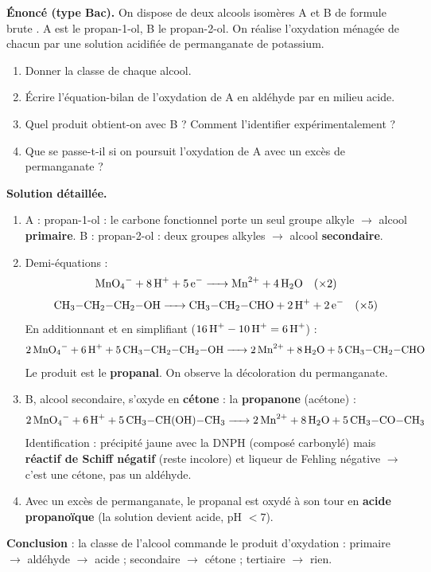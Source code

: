 \documentclass[11pt]{article}
\begin{document}
\begin{exoresolu}
\textbf{Énoncé (type Bac).} On dispose de deux alcools isomères A et B de formule brute . A est le propan-1-ol, B le propan-2-ol. On réalise l'oxydation ménagée de chacun par une solution acidifiée de permanganate de potassium.
\begin{enumerate}
\item Donner la classe de chaque alcool.
\item Écrire l'équation-bilan de l'oxydation de A en aldéhyde par  en milieu acide.
\item Quel produit obtient-on avec B ? Comment l'identifier expérimentalement ?
\item Que se passe-t-il si on poursuit l'oxydation de A avec un excès de permanganate ?
\end{enumerate}
\tcblower
\textbf{Solution détaillée.}
\begin{enumerate}
\item A : propan-1-ol  : le carbone fonctionnel porte un seul groupe alkyle $\to$ alcool \textbf{primaire}. B : propan-2-ol  : deux groupes alkyles $\to$ alcool \textbf{secondaire}.
\item Demi-équations :
\[ \ce{MnO4^- + 8 H^+ + 5 e^- -> Mn^2+ + 4 H2O} \quad (\times 2) \]
\[ \ce{CH3-CH2-CH2-OH -> CH3-CH2-CHO + 2 H^+ + 2 e^-} \quad (\times 5) \]
En additionnant et en simplifiant ($16\,\ce{H^+} - 10\,\ce{H^+} = 6\,\ce{H^+}$) :
\[ \ce{2 MnO4^- + 6 H^+ + 5 CH3-CH2-CH2-OH -> 2 Mn^2+ + 8 H2O + 5 CH3-CH2-CHO} \]
Le produit est le \textbf{propanal}. On observe la décoloration du permanganate.
\item B, alcool secondaire, s'oxyde en \textbf{cétone} : la \textbf{propanone} (acétone)  :
\[ \ce{2 MnO4^- + 6 H^+ + 5 CH3-CH(OH)-CH3 -> 2 Mn^2+ + 8 H2O + 5 CH3-CO-CH3} \]
Identification : précipité jaune avec la DNPH (composé carbonylé) mais \textbf{réactif de Schiff négatif} (reste incolore) et liqueur de Fehling négative $\to$ c'est une cétone, pas un aldéhyde.
\item Avec un excès de permanganate, le propanal est oxydé à son tour en \textbf{acide propanoïque}  (la solution devient acide, pH $< 7$).
\end{enumerate}
\textbf{Conclusion} : la classe de l'alcool commande le produit d'oxydation : primaire $\to$ aldéhyde $\to$ acide ; secondaire $\to$ cétone ; tertiaire $\to$ rien.
\end{exoresolu}
\end{document}
